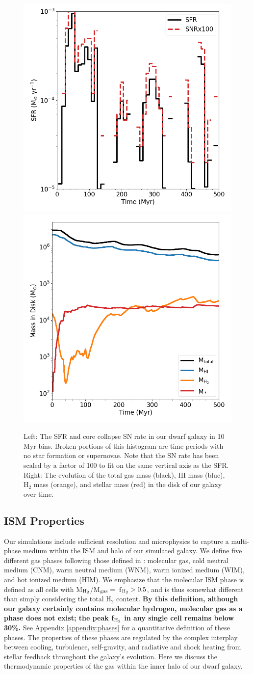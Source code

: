 \documentclass[fleqn,usenatbib,useAMS]{mnras}
\begin{document}
\begin{figure}
\centering
\includegraphics[width=0.475\linewidth]{sfr_snrx100}
\includegraphics[width=0.475\linewidth]{mass_evolution}
\caption{Left: The SFR and core collapse SN rate in our dwarf galaxy in 10 Myr bins. Broken portions of this histogram are time periods with no star formation or supernovae.  Note that the SN rate has been scaled by a factor of 100 to fit on the same vertical axis as the SFR. Right: The evolution of the total gas mass (black), HI mass (blue), H$_2$ mass (orange), and stellar mass (red) in the disk of our galaxy over time.}
\label{fig:sfr_mass_evolution}
\end{figure}

\subsection{ISM Properties}
\label{sec:phase}

Our simulations include sufficient resolution and microphysics to capture a multi-phase medium within the ISM and halo of our simulated galaxy. We define five different gas phases following those defined in \citep{Draine2011}: molecular gas, cold neutral medium (CNM), warm neutral medium (WNM), warm ionized medium (WIM), and hot ionized medium (HIM). We emphasize that the molecular ISM phase is defined as all cells with M$_{\rm H_2}$/M$_{\rm gas} = $~f$_{\rm H_2} > 0.5$, and is thus somewhat different than simply considering the total H$_2$ content. \textbf{By this definition, although our galaxy certainly contains molecular hydrogen, molecular gas as a phase does not exist; the peak f$_{\rm H_2}$ in any single cell remains below 30\%.} See Appendix \ref{appendix:phases} for a quantitative definition of these phases. The properties of these phases are regulated by the complex interplay between cooling, turbulence, self-gravity, and radiative and shock heating from stellar feedback throughout the galaxy's evolution. Here we discuss the thermodynamic properties of the gas within the inner halo of our dwarf galaxy.
\end{document}
